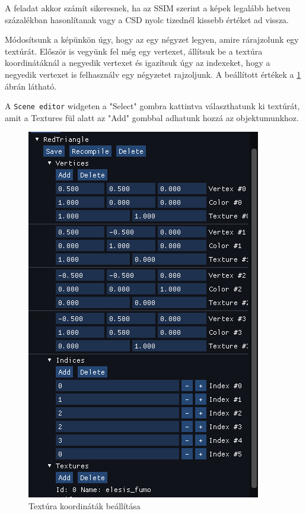 A feladat akkor számít sikeresnek, ha az SSIM szerint a képek legalább hetven százalékban hasonlítanak vagy a CSD nyolc tizednél kissebb értéket ad vissza.

Módosítsunk a képünkön úgy, hogy az egy négyzet legyen, amire rárajzolunk egy textúrát.
Először is vegyünk fel még egy vertexet, állítsuk be a textúra koordinátáknál a negyedik vertexet és igazítsuk úgy az indexeket, hogy a negyedik vertexet is felhasználv egy négyzetet rajzoljunk. A beállított értékek a \ref{fig:modifiedvertices} ábrán látható.

A \verb|Scene editor| widgeten a "Select" gombra kattintva választhatunk ki textúrát, amit a Textures fül alatt az "Add" gombbal adhatunk hozzá az objektumunkhoz.

\begin{figure}[hbt!]
    \centering
    \includegraphics[width=\textwidth/2,height=\textheight/2,keepaspectratio]
    {resources/Showcase/slimshady_modifiedVertices.png}
    \caption{Textúra koordináták beállítása}
    \label{fig:modifiedvertices}
\end{figure}


